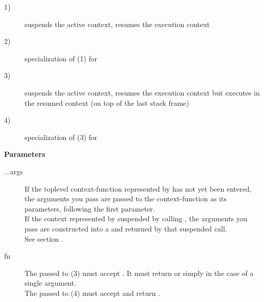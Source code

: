 \begin{description}
    \item[1)] suspends the active context, resumes the execution context
    \item[2)] specialization of (1) for 
    \item[3)] suspends the active context, resumes the execution context but
        executes  in the resumed context (on top of the
        last stack frame)
    \item[4)] specialization of (3) for 
\end{description}

{\bfseries Parameters}
\begin{description}
    \item[...args] If the toplevel context-function represented
                   by  has not yet been entered, the arguments
                   you pass are passed to the context-function as its
                   parameters, following the \ectx first parameter. \\
                   If the context represented by  suspended by
                   calling \op, the arguments you pass
                   are constructed into a \ectxargstup and returned by
                   that suspended \op call. \\
                   See section .\\
    \item[fn]      The  passed to (3) must accept . It
                   must return  or simply  in
                   the case of a single argument.\\
                   The  passed to (4) must accept and return .\\
\end{description}

